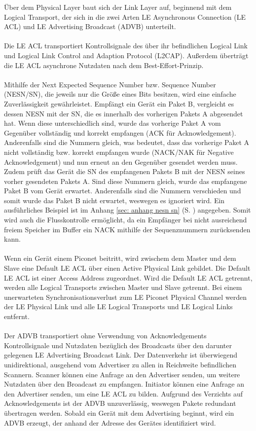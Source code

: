Über dem Physical Layer baut sich der Link Layer auf, beginnend mit dem Logical Transport, der sich in die zwei Arten LE Asynchronous Connection (LE ACL) und LE Advertising Broadcast (ADVB) unterteilt.
\\\\
Die LE ACL transportiert Kontrollsignale des über ihr befindlichen Logical Link und Logical Link Control and Adaption Protocol (L2CAP). Außerdem überträgt die LE ACL asynchrone Nutzdaten nach dem Best-Effort-Prinzip.
\\\\
Mithilfe der Next Expected Sequence Number bzw. Sequence Number (NESN/SN), die jeweils nur die Größe eines Bits besitzen, wird eine einfache Zuverlässigkeit gewährleistet. Empfängt ein Gerät ein Paket B, vergleicht es dessen NESN mit der SN, die es innerhalb des vorherigen Pakets A abgesendet hat. Wenn diese unterschiedlich sind, wurde das vorherige Paket A vom Gegenüber vollständig und korrekt empfangen (ACK für Acknowledgement). Anderenfalls sind die Nummern gleich, was bedeutet, dass das vorherige Paket A nicht vollständig bzw. korrekt empfangen wurde (NACK/NAK für Negative Acknowledgement) und nun erneut an den Gegenüber gesendet werden muss. Zudem prüft das Gerät die SN des empfangenen Pakets B mit der NESN seines vorher gesendeten Pakets A. Sind diese Nummern gleich, wurde das empfangene Paket B vom Gerät erwartet. Anderenfalls sind die Nummern verschieden und somit wurde das Paket B nicht erwartet, weswegen es ignoriert wird. Ein ausführliches Beispiel ist im Anhang \ref{sec: anhang nesn sn} (S. \pageref{sec: anhang nesn sn}) angegeben. Somit wird auch die Flusskontrolle ermöglicht, da ein Empfänger bei nicht ausreichend freiem Speicher im Buffer ein NACK mithilfe der Sequenznummern zurücksenden kann. \cite{BtSpec4.0_2239-2241}
\\\\
Wenn ein Gerät einem Piconet beitritt, wird zwischem dem Master und dem Slave eine Default LE ACL über einen Active Physical Link gebildet. Die Default LE ACL ist einer Access Address zugeordnet. Wird die Default LE ACL getrennt, werden alle Logical Transports zwischen Master und Slave getrennt. Bei einem unerwarteten Synchronisationsverlust zum LE Piconet Physical Channel werden der LE Physical Link und alle LE Logical Transports und LE Logical Links entfernt.
\\\\
Der ADVB transportiert ohne Verwendung von Acknowledgements Kontrollsignale und Nutzdaten bezüglich des Broadcasts über den darunter gelegenen LE Advertising Broadcast Link. Der Datenverkehr ist überwiegend unidirektional, ausgehend vom Advertiser zu allen in Reichweite befindlichen Scannern. Scanner können eine Anfrage an den Advertiser senden, um weitere Nutzdaten über den Broadcast zu empfangen. Initiator können eine Anfrage an den Advertiser senden, um eine LE ACL zu bilden. Aufgrund des Verzichts auf Acknowledgements ist der ADVB unzuverlässig, weswegen Pakete redundant übertragen werden. Sobald ein Gerät mit dem Advertising beginnt, wird ein ADVB erzeugt, der anhand der Adresse des Gerätes identifiziert wird. \cite{BtSpec4.0_174-175}
